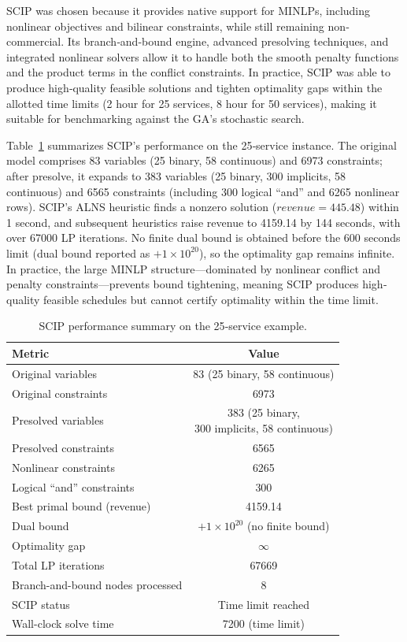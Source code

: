 \documentclass[Afour,sagev,times]{sagej}
\begin{document}
SCIP was chosen because it provides native support for MINLPs, including nonlinear objectives and bilinear constraints, while still remaining non‐commercial. Its branch‐and‐bound engine, advanced presolving techniques, and integrated nonlinear solvers allow it to handle both the smooth penalty functions and the product terms in the conflict constraints. In practice, SCIP was able to produce high‐quality feasible solutions and tighten optimality gaps within the allotted time limits (2 hour for 25 services, 8 hour for 50 services), making it suitable for benchmarking against the GA’s stochastic search.

Table~\ref{tab:scip_25_summary} summarizes SCIP’s performance on the 25‐service instance. The original model comprises 83 variables (25 binary, 58 continuous) and 6973 constraints; after presolve, it expands to 383 variables (25 binary, 300 implicits, 58 continuous) and 6565 constraints (including 300 logical ``and'' and 6265 nonlinear rows). SCIP’s ALNS heuristic finds a nonzero solution ($ revenue = 445.48 $) within 1 second, and subsequent heuristics raise revenue to 4159.14 by 144 seconds, with over 67000 LP iterations. No finite dual bound is obtained before the 600 seconds limit (dual bound reported as \(+1\times10^{20}\)), so the optimality gap remains infinite. In practice, the large MINLP structure—dominated by nonlinear conflict and penalty constraints—prevents bound tightening, meaning SCIP produces high‐quality feasible schedules but cannot certify optimality within the time limit.

\begin{table}[htbp]
\centering
\scriptsize
\caption{SCIP performance summary on the 25‐service example.}
\begin{tabular}{|p{}|c|}
\hline
\textbf{Metric} & \textbf{Value} \\ \hline
Original variables & 83 (25 binary, 58 continuous) \\ 
Original constraints & 6973 \\ \hline
Presolved variables & \makecell{383 (25 binary, \\ 300 implicits, 58 continuous)} \\ 
Presolved constraints & 6565 \\ 
  Nonlinear constraints & 6265 \\ 
  Logical “and” constraints & 300 \\ \hline
Best primal bound (revenue) & 4159.14 \\ 
Dual bound & \(+1\times10^{20}\) (no finite bound) \\ 
Optimality gap & \(\infty\) \\ \hline
Total LP iterations & 67669 \\ 
Branch-and-bound nodes processed & 8 \\ 
SCIP status & Time limit reached \\ 
Wall-clock solve time & 7200 (time limit) \\ \hline
\end{tabular}
\label{tab:scip_25_summary}
\end{table}
\end{document}
